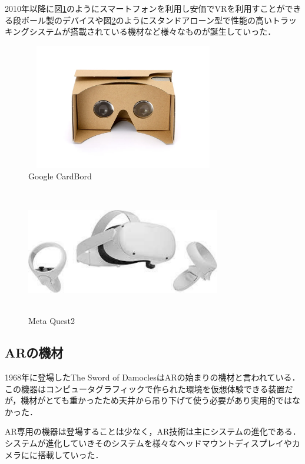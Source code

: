 \documentclass[12pt,a4j]{ltjsarticle}
\begin{document}
2010年以降に図\ref{fig:Google_CardBord.pdf}のようにスマートフォンを利用し安価でVRを利用すことができる段ボール製のデバイスや図\ref{fig:Meta_Quest2.pdf}のようにスタンドアローン型で性能の高いトラッキングシステムが搭載されている機材など様々なものが誕生していった．
\begin{figure}[h]
\begin{center}
 \includegraphics[clip,width=85mm,height=55mm]{Google_CardBord.pdf}
\end{center}
 \caption{Google CardBord}
 \label{fig:Google_CardBord.pdf}
\end{figure}

\begin{figure}[h]
\begin{center}
 \includegraphics[clip,width=85mm,height=55mm]{Meta_Quest2.pdf}
\end{center}
 \caption{Meta Quest2}
 \label{fig:Meta_Quest2.pdf}
\end{figure}

\subsection{ARの機材}
1968年に登場したThe Sword of DamoclesはARの始まりの機材と言われている．
この機器はコンピュータグラフィックで作られた環境を仮想体験できる装置だが，機材がとても重かったため天井から吊り下げて使う必要があり実用的ではなかった．

AR専用の機器は登場することは少なく，AR技術は主にシステムの進化である．
システムが進化していきそのシステムを様々なヘッドマウントディスプレイやカメラにに搭載していった．
\end{document}
